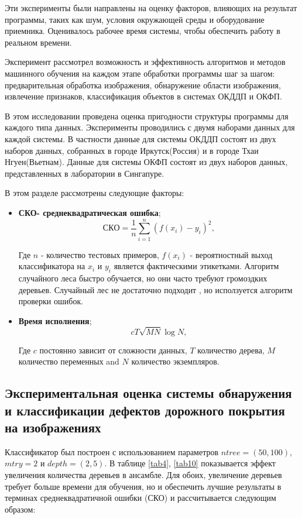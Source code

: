 \documentclass[a4paper,14pt]{extreport}
\begin{document}
Эти эксперименты были направлены на оценку факторов, влияющих на результат программы, таких как шум, условия окружающей среды и оборудование приемника. Оценивалось рабочее время системы, чтобы обеспечить работу в реальном времени.

Эксперимент рассмотрел возможность и эффективность алгоритмов и методов машинного обучения на каждом этапе обработки программы шаг за шагом: предварительная обработка изображения, обнаружение области изображения, извлечение признаков, классификация объектов в системах ОКДДП и ОКФП.

В этом исследовании проведена оценка пригодности структуры программы для каждого типа данных. Эксперименты проводились с двумя наборами данных для каждой системы. В частности данные для системы ОКДДП состоят из двух наборов данных, собранных в городе Иркутск(Россия) и в городе Тхаи Нгуен(Вьетнам). Данные для системы ОКФП состоят из двух наборов данных, представленных в лаборатории в Сингапуре.

В этом разделе рассмотрены следующие факторы:

\begin{itemize}
\item \textbf{СКО- среднеквадратическая ошибка};
\begin{equation}\label{eq13}
СКО=\frac{1}{n} \sum_{i=1}^n (f(x_i)-y_i)^2,
\end{equation}

Где $n$ - количество тестовых примеров, $f\left(x_i\right)$ - вероятностный выход  классификатора на $x_i$ и $y_i$ является фактическими этикетками. Алгоритм случайного леса быстро обучается, но они часто требуют громоздких деревьев. Случайный лес не достаточно подходит , но исползуется алгоритм проверки ошибок.

 \item \textbf{Время исполнения};
\begin{equation}
cT\sqrt{MN}\log N,
\end{equation}

Где $c$ постоянно зависит от сложности данных, $T$ количество дерева, $M$ количество переменных and $N$ количество экземпляров. 
\end{itemize}

\subsection{Экспериментальная оценка системы обнаружения и классификации дефектов дорожного покрытия на изображениях}
Классификатор был построен с использованием параметров $ntree=\left(50, 100\right)$, $mtry=2$ и $depth=\left(2, 5\right)$. В таблице \ref{tab4}, \ref{tab10} показывается эффект увеличения количества деревьев в ансамбле. Для обоих, увеличение деревьев требует больше времени для обучения, но и обеспечить лучшие результаты в терминах среднеквадратичной ошибки (СКО)  и рассчитывается следующим образом:
\end{document}
